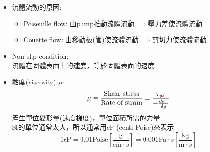 \documentclass[../main.tex]{subfiles}
\begin{document}
\begin{itemize}
\begin{itemize}
\begin{itemize}
        \item Shear Stress，剪切應力: $\tau$
          ，稱為Shear stress $\tau$\\
          所以也可以稱為動量通量(momentum flux)
          \begin{equation}
            \tau  = \frac{\Delta \vec {\bm P}}{A t}
          \end{equation}
          $\tau_{yx}$: 流體在$x$方向上流動，所造成$y$方向上的動量傳送
      \end{itemize}
    \item Steady-state $\Rightarrow$ 函數$f$對時間$t$無關
    \item uniform $\Rightarrow$函數$f$與空間$(x,y,z)$無關
    \item Balance Equation
      \begin{equation}
        \text{input} - \text{output} + \text{generation} = \text{accumulation}
      \end{equation}
      其中Accumulation要表示為:
  \end{itemize}
  \item 流體流動的原因:
  \begin{itemize}
    \item Poiseuille flow: 由pump推動流體流動$\implies$壓力差使流體流動
    \item Couette flow: 由移動板(管)使流體流動$\implies$剪切力使流體流動
  \end{itemize}
  \item Non-slip condition:\\
    流體在固體表面上的速度，等於固體表面的速度
  \item 黏度(viscosity) $\mu$:
  \begin{equation}
    \mu \equiv \frac{\text{Shear stress}}{\text{Rate of strain}} = \frac{\tau_{y{\color{red}{x}}}}{-\frac{du_{{\color{red}{x}}}}{dy}}
  \end{equation}
  產生單位變形量(速度梯度)，單位面積所需的力量\\
  SI的單位通常太大，所以通常用cP (centi Poise)來表示
  \begin{equation}
    1 \textrm{cP} = 0.01 \textrm{Poise} \left[\frac{\textrm{g}}{\textrm{cm}\cdot s}\right] 
    = 0.001 \textrm{Pa}\cdot s \left[\frac{\textrm{kg}}{\textrm{m}\cdot s}\right]
  \end{equation}
  \\
  \\

\end{itemize}
\end{document}
